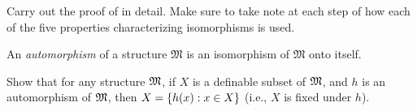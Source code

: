 \documentclass[../../../include/open-logic-section]{subfiles}
\begin{document}
\begin{prob}
Carry out the proof of  in detail. Make
sure to take note at each step of how each of the five properties
characterizing isomorphisms is used.
\end{prob}

\begin{defn}
An \emph{automorphism} of a structure $\mathfrak{M}$ is an isomorphism
of $\mathfrak{M}$ onto itself.
\end{defn}

\begin{prob}
Show that for any structure $\mathfrak M$, if $X$ is a definable subset
of $\mathfrak M$, and $h$ is an automorphism of $\mathfrak M$, then $X
= \{ h(x) : x \in X \}$ (i.e., $X$ is fixed under $h$).
\end{prob}
\end{document}
